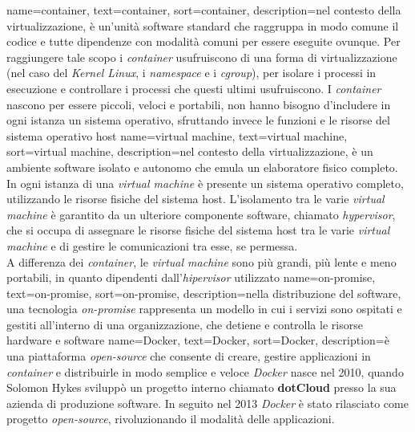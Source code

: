 {
    name={container},
    text=container,
    sort=container,
    description={nel contesto della virtualizzazione, è un'unità software standard che raggruppa in modo comune il codice e tutte 
    dipendenze con modalità comuni per essere eseguite ovunque. Per raggiungere tale scopo i \textit{container} usufruiscono di una forma 
    di virtualizzazione (nel caso del \textit{Kernel Linux}, i \textit{namespace} e i \textit{cgroup}), per isolare i processi in esecuzione 
    e controllare i processi che questi ultimi usufruiscono.
    I \textit{container} nascono per essere piccoli, veloci e portabili, non hanno bisogno d'includere in ogni istanza un sistema operativo,
    sfruttando invece le funzioni e le risorse del sistema operativo host}
}
{
    name={virtual machine},
    text=virtual machine,
    sort=virtual machine,
    description={nel contesto della virtualizzazione, è un ambiente software isolato e autonomo che emula un elaboratore fisico completo.
    In ogni istanza di una \textit{virtual machine} è presente un sistema operativo completo, utilizzando le risorse 
    fisiche del sistema host. L'isolamento tra le varie \textit{virtual machine} è garantito da un 
    ulteriore componente software, chiamato \textit{hypervisor}, che si occupa di assegnare le risorse fisiche del sistema host tra le varie \textit{virtual machine} e di gestire le comunicazioni tra esse, se permessa.\\
    A differenza dei \textit{container}, le \textit{virtual machine} sono più grandi, più lente e meno portabili, in quanto dipendenti dall'\textit{hipervisor} utilizzato}
}
{
    name={on-promise},
    text=on-promise,
    sort=on-promise,
    description={nella distribuzione del software, una tecnologia \textit{on-promise} rappresenta
     un modello in cui i servizi sono ospitati e gestiti all'interno di una 
    organizzazione, che detiene e controlla le risorse hardware e software}
}
{
    name={Docker},
    text=Docker,
    sort=Docker,
    description={è una piattaforma \textit{open-source} che consente di creare, gestire applicazioni in \textit{container} e distribuirle in modo semplice e veloce
    \textit{Docker} nasce nel 2010, quando Solomon Hykes sviluppò un progetto interno chiamato \textbf{dotCloud} presso la sua azienda di produzione software. In seguito 
    nel 2013 \textit{Docker} è stato rilasciato come progetto \textit{open-source}, rivoluzionando il modalità delle applicazioni.}
}
